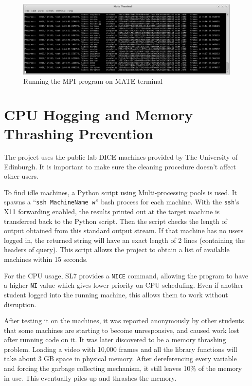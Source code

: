 \documentclass[bsc,logo,twoside,fullspacing,parskip]{infthesis}
\begin{document}
\begin{figure}
    \centering
    \includegraphics[scale=0.30]{graph/sample_terminal.png}
    \caption{Running the MPI program on MATE terminal}
    \label{fig:mpi}
\end{figure}

\section{CPU Hogging and Memory Thrashing Prevention}

The project uses the public lab DICE machines provided by The University of Edinburgh. 
It is important to make sure the cleaning procedure doesn't affect other users.

To find idle machines, a Python script using Multi-processing pools is used. 
It spawns a ``{\tt ssh MachineName w}'' bash process for each machine.
With the {\tt ssh}'s X11 forwarding enabled, the results printed out at the target machine is transferred back to the Python script. 
Then the script checks the length of output obtained from this standard output stream. 
If that machine has no users logged in, the returned string will have an exact length of 2 lines (containing the headers of query). 
This script allows the project to obtain a list of available machines within 15 seconds.

For the CPU usage, SL7 provides a {\tt NICE} command, allowing the program to have a higher {\tt NI} value which gives lower priority on CPU scheduling. Even if another student logged into the running machine, this allows them to work without disruption.

After testing it on the machines, it was reported anonymously by other students that some machines are starting to become unresponsive, and caused work lost after running code on it. It was later discovered to be a memory thrashing problem.
Loading a video with 10,000 frames and all the library functions will take about 3 GB space in physical memory. 
After dereferencing every variable and forcing the garbage collecting mechanism, it still leaves 10\% of the memory in use. This eventually piles up and thrashes the memory. 
\end{document}
